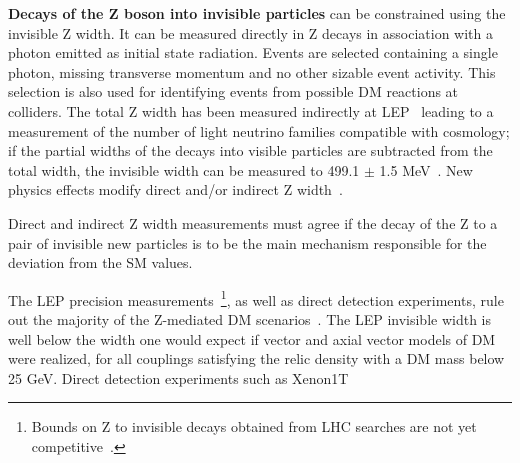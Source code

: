 
\textbf{Decays of the Z boson into invisible particles} can be constrained using the invisible Z width. It can be measured directly in Z decays in association with a photon emitted as initial state radiation. Events are selected containing a single photon, missing transverse momentum and no other sizable event activity. This selection is also used for identifying events from possible DM reactions at colliders.
The total Z width has been measured indirectly at LEP~\cite{ALEPH:2005ab} leading to a measurement of the number of light neutrino families compatible with cosmology; if the partial widths of the decays into visible particles are subtracted from the total width, the invisible width can be measured to 499.1 $\pm$ 1.5 MeV~\cite{Patrignani:2016xqp}. 
New physics effects modify direct and/or indirect Z width~\cite{Carena:2003aj}.
\begin{marginnote}[]
Direct and indirect Z width measurements must agree if the decay of the Z to a pair of invisible new particles is to be the main mechanism responsible for the deviation from the SM values. 
\end{marginnote}%
The LEP precision measurements~\footnote{Bounds on Z to invisible decays obtained from LHC searches are not yet competitive~\cite{deSimone:2014pda}.}, as well as direct detection experiments, rule out the majority of the Z-mediated DM scenarios~\cite{Arcadi:2014lta,Escudero:2016gzx}. The LEP invisible width is well below the width one would expect if vector and axial vector models of DM were realized, for all couplings satisfying the relic density with a DM mass below 25 GeV. Direct detection experiments such as Xenon1T~\cite{Aprile:2017iyp} 
